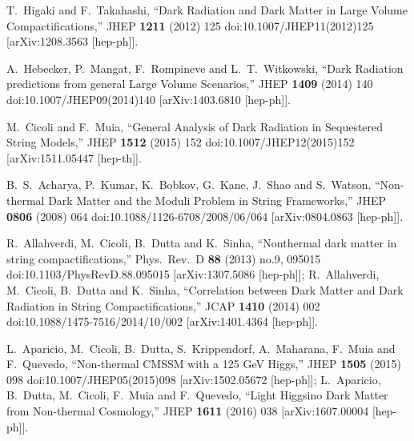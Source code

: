 \documentclass[11pt,a4paper]{article}
\begin{document}
\begin{thebibliography}{99}
  T.~Higaki and F.~Takahashi,
  ``Dark Radiation and Dark Matter in Large Volume Compactifications,''
  JHEP {\bf 1211} (2012) 125
  doi:10.1007/JHEP11(2012)125
  [arXiv:1208.3563 [hep-ph]].

  A.~Hebecker, P.~Mangat, F.~Rompineve and L.~T.~Witkowski,
  ``Dark Radiation predictions from general Large Volume Scenarios,''
  JHEP {\bf 1409} (2014) 140
  doi:10.1007/JHEP09(2014)140
  [arXiv:1403.6810 [hep-ph]].
	
  M.~Cicoli and F.~Muia,
  ``General Analysis of Dark Radiation in Sequestered String Models,''
  JHEP {\bf 1512} (2015) 152
  doi:10.1007/JHEP12(2015)152
  [arXiv:1511.05447 [hep-th]].

  B.~S.~Acharya, P.~Kumar, K.~Bobkov, G.~Kane, J.~Shao and S.~Watson,
  ``Non-thermal Dark Matter and the Moduli Problem in String Frameworks,''
  JHEP {\bf 0806} (2008) 064
  doi:10.1088/1126-6708/2008/06/064
  [arXiv:0804.0863 [hep-ph]].

  R.~Allahverdi, M.~Cicoli, B.~Dutta and K.~Sinha,
  ``Nonthermal dark matter in string compactifications,''
  Phys.\ Rev.\ D {\bf 88} (2013) no.9,  095015
  doi:10.1103/PhysRevD.88.095015
  [arXiv:1307.5086 [hep-ph]];
R.~Allahverdi, M.~Cicoli, B.~Dutta and K.~Sinha,
  ``Correlation between Dark Matter and Dark Radiation in String Compactifications,''
  JCAP {\bf 1410} (2014) 002
  doi:10.1088/1475-7516/2014/10/002
  [arXiv:1401.4364 [hep-ph]].

  L.~Aparicio, M.~Cicoli, B.~Dutta, S.~Krippendorf, A.~Maharana, F.~Muia and F.~Quevedo,
  ``Non-thermal CMSSM with a 125 GeV Higgs,''
  JHEP {\bf 1505} (2015) 098
  doi:10.1007/JHEP05(2015)098
  [arXiv:1502.05672 [hep-ph]];
  L.~Aparicio, B.~Dutta, M.~Cicoli, F.~Muia and F.~Quevedo,
  ``Light Higgsino Dark Matter from Non-thermal Cosmology,''
  JHEP {\bf 1611} (2016) 038
  [arXiv:1607.00004 [hep-ph]].


\end{thebibliography}
\end{document}
